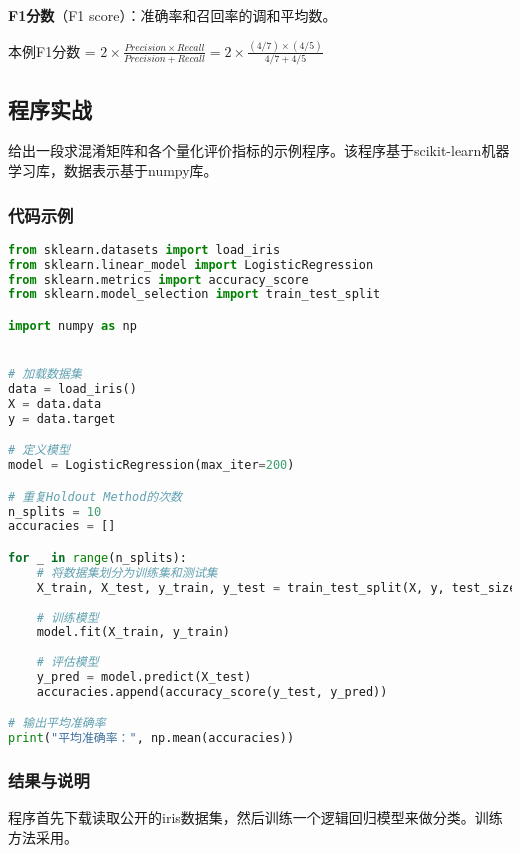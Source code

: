 \textbf{F1分数}（F1 score）：准确率和召回率的调和平均数。

本例F1分数 = $ 2 \times \frac{Precision \times Recall}{Precision + Recall} = 2 \times \frac{(4/7) \times (4/5)}{4/7+4/5}$

\subsection{程序实战}

给出一段求混淆矩阵和各个量化评价指标的示例程序。该程序基于scikit-learn机器学习库，数据表示基于numpy库。

\subsubsection{代码示例}

\begin{lstlisting}[language=python]
from sklearn.datasets import load_iris
from sklearn.linear_model import LogisticRegression
from sklearn.metrics import accuracy_score
from sklearn.model_selection import train_test_split

import numpy as np


# 加载数据集
data = load_iris()
X = data.data
y = data.target

# 定义模型
model = LogisticRegression(max_iter=200)

# 重复Holdout Method的次数
n_splits = 10
accuracies = []

for _ in range(n_splits):
    # 将数据集划分为训练集和测试集
    X_train, X_test, y_train, y_test = train_test_split(X, y, test_size=0.2)
    
    # 训练模型
    model.fit(X_train, y_train)
    
    # 评估模型
    y_pred = model.predict(X_test)
    accuracies.append(accuracy_score(y_test, y_pred))

# 输出平均准确率
print("平均准确率：", np.mean(accuracies))

\end{lstlisting}

\subsubsection{结果与说明}
程序首先下载读取公开的iris数据集，然后训练一个逻辑回归模型来做分类。训练方法采用。